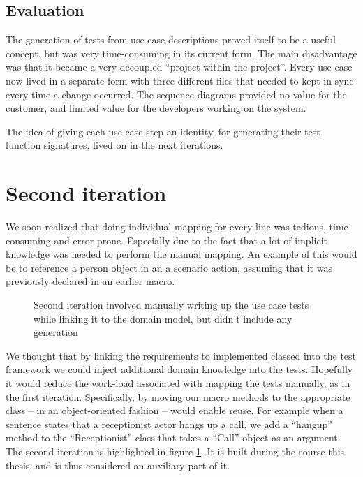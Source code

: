 \subsection{Evaluation}
The generation of tests from use case descriptions proved itself to be a useful concept, but was very time-consuming in its current form. The main disadvantage was that it became a very decoupled ``project within the project''. Every use case now lived in a separate form with three different files that needed to kept in sync every time a change occurred. The sequence diagrams provided no value for the customer, and limited value for the developers working on the system.\smallskip

\noindent The idea of giving each use case step an identity, for generating their test function signatures, lived on in the next iterations.

\section{Second iteration}
We soon realized that doing individual mapping for every line was tedious, time consuming and error-prone. Especially due to the fact that a lot of implicit knowledge was needed to perform the manual mapping. An example of this would be to reference a person object in an a scenario action, assuming that it was previously declared in an earlier macro.\medskip
\begin{figure}[!htbp]
\centering
{}
\caption{Second iteration involved manually writing up the use case tests while linking it to the domain model, but didn't include any generation}
\label{fig:project_parameter_plot_2nd_iteration}
\end{figure}
\noindent We thought that by linking the requirements to implemented classed into the test framework we could inject additional domain knowledge into the tests. Hopefully it would reduce the work-load associated with mapping the tests manually, as in the first iteration. Specifically, by moving our macro methods to the appropriate class -- in an object-oriented fashion -- would enable reuse. For example when a sentence states that a receptionist actor hangs up a call, we add a ``hangup'' method to the  ``Receptionist'' class that takes a ``Call'' object as an argument. The second iteration is highlighted in figure \ref{fig:project_parameter_plot_2nd_iteration}. It is built during the course this thesis, and is thus considered an auxiliary part of it.

